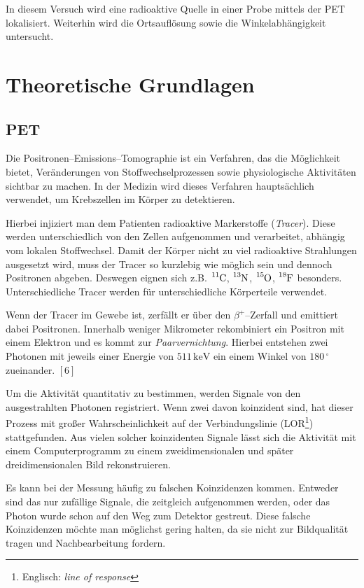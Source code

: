 \documentclass[12pt,a4paper]{scrartcl}
\numberwithin{equation}{section} %
\newcommand{\pu}[1]{\ensuremath{\mathrm{#1}}}
\begin{document}
In diesem Versuch wird eine radioaktive Quelle in einer Probe mittels der PET lokalisiert. Weiterhin wird die Ortsauflösung sowie die Winkelabhängigkeit untersucht.

\clearpage
\hypertarget{theoretische-grundlagen}{%
\section{Theoretische Grundlagen}\label{theoretische-grundlagen}}

\hypertarget{pet}{%
\subsection{PET}\label{pet}}

Die Positronen--Emissions--Tomographie ist ein Verfahren, das die Möglichkeit bietet, Veränderungen von Stoffwechselprozessen sowie physiologische Aktivitäten sichtbar zu machen. In der Medizin wird dieses Verfahren hauptsächlich verwendet, um Krebszellen im Körper zu detektieren.

Hierbei injiziert man dem Patienten radioaktive Markerstoffe (\emph{Tracer}). Diese werden unterschiedlich von den Zellen aufgenommen und verarbeitet, abhängig vom lokalen Stoffwechsel. Damit der Körper nicht zu viel radioaktive Strahlungen ausgesetzt wird, muss der Tracer so kurzlebig wie möglich sein und dennoch Positronen abgeben. Deswegen eignen sich z.B. $\ce{^{11}C}$, $\ce{^{13}N}$, $\ce{^{15}O}$,
$\ce{^{18}F}$ besonders. Unterschiedliche Tracer werden für unterschiedliche Körperteile verwendet.

Wenn der Tracer im Gewebe ist, zerfällt er über den $\beta^+$--Zerfall und emittiert dabei Positronen. Innerhalb weniger Mikrometer rekombiniert ein Positron mit einem Elektron und es kommt zur \emph{Paarvernichtung}. Hierbei entstehen zwei Photonen mit jeweils einer Energie von $\pu{511 \,keV}$ ein einem Winkel von $180\,^\circ$ zueinander. $[6]$

Um die Aktivität quantitativ zu bestimmen, werden Signale von den ausgestrahlten Photonen registriert. Wenn zwei davon koinzident sind, hat dieser Prozess mit großer Wahrscheinlichkeit auf der Verbindungslinie (LOR\footnote{Englisch: \emph{line of response}}) stattgefunden. Aus vielen solcher koinzidenten Signale lässt sich die Aktivität mit einem Computerprogramm zu einem zweidimensionalen und später dreidimensionalen Bild rekonstruieren.

Es kann bei der Messung häufig zu falschen Koinzidenzen kommen. Entweder sind das nur zufällige Signale, die zeitgleich aufgenommen werden, oder das Photon wurde schon auf den Weg zum Detektor gestreut. Diese falsche Koinzidenzen möchte man möglichst gering halten, da sie nicht zur Bildqualität tragen und Nachbearbeitung fordern.
\end{document}
